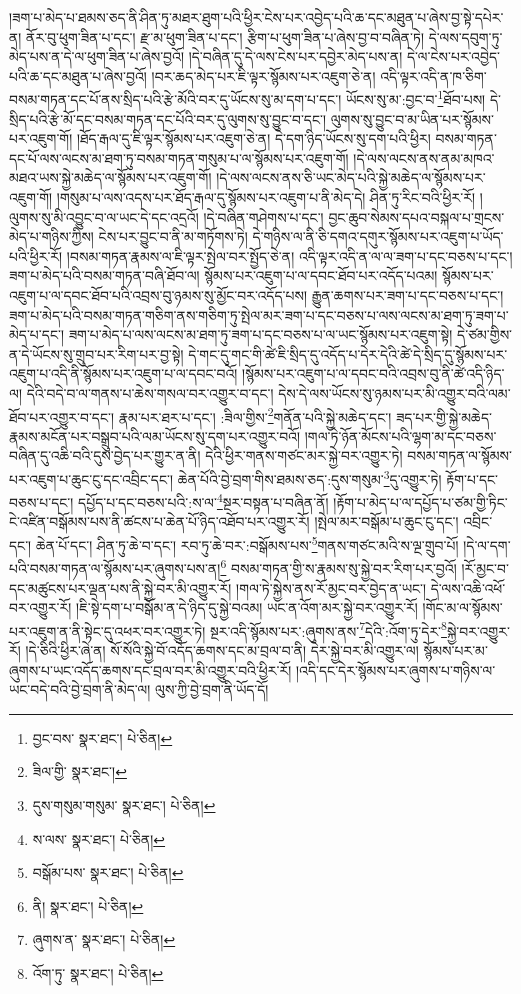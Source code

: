 །ཟག་པ་མེད་པ་ཐམས་ཅད་ནི་ཤིན་ཏུ་མཐར་ཐུག་པའི་ཕྱིར་ངེས་པར་འབྱེད་པའི་ཆ་དང་མཐུན་པ་ཞེས་བྱ་སྟེ་དཔེར་ན། ནོར་བུ་ཕུག་ཟིན་པ་དང་། རྫ་མ་ཕུག་ཟིན་པ་དང་། རྩིག་པ་ཕུག་ཟིན་པ་ཞེས་བྱ་བ་བཞིན་ཏེ། དེ་ལས་དབུག་ཏུ་མེད་པས་ན་དེ་ལ་ཕུག་ཟིན་པ་ཞེས་བྱའོ། །དེ་བཞིན་དུ་དེ་ལས་ངེས་པར་དབྱེར་མེད་པས་ན། དེ་ལ་ངེས་པར་འབྱེད་པའི་ཆ་དང་མཐུན་པ་ཞེས་བྱའོ། །བར་ཆད་མེད་པར་ཇི་ལྟར་སྙོམས་པར་འཇུག་ཅེ་ན། འདི་ལྟར་འདི་ན་ཁ་ཅིག་བསམ་གཏན་དང་པོ་ནས་སྲིད་པའི་རྩེ་མོའི་བར་དུ་ཡོངས་སུ་མ་དག་པ་དང་། ཡོངས་སུ་མ་:བྱང་བ་\footnote{བྱང་བས་  སྣར་ཐང་།  པེ་ཅིན། }ཐོབ་པས། དེ་སྲིད་པའི་རྩེ་མོ་དང་བསམ་གཏན་དང་པོའི་བར་དུ་ལུགས་སུ་བྱུང་བ་དང་། ལུགས་སུ་བྱུང་བ་མ་ཡིན་པར་སྙོམས་པར་འཇུག་གོ། །ཐོད་རྒལ་དུ་ཇི་ལྟར་སྙོམས་པར་འཇུག་ཅེ་ན། དེ་དག་ཉིད་ཡོངས་སུ་དག་པའི་ཕྱིར། བསམ་གཏན་དང་པོ་ལས་ལངས་མ་ཐག་ཏུ་བསམ་གཏན་གསུམ་པ་ལ་སྙོམས་པར་འཇུག་གོ། །དེ་ལས་ལངས་ནས་ནམ་མཁའ་མཐའ་ཡས་སྐྱེ་མཆེད་ལ་སྙོམས་པར་འཇུག་གོ། །དེ་ལས་ལངས་ནས་ཅི་ཡང་མེད་པའི་སྐྱེ་མཆེད་ལ་སྙོམས་པར་འཇུག་གོ། །གསུམ་པ་ལས་འདས་པར་ཐོད་རྒལ་དུ་སྙོམས་པར་འཇུག་པ་ནི་མེད་དེ། ཤིན་ཏུ་རིང་བའི་ཕྱིར་རོ། །ལུགས་སུ་མི་འབྱུང་བ་ལ་ཡང་དེ་དང་འདྲའོ། །དེ་བཞིན་གཤེགས་པ་དང་། བྱང་ཆུབ་སེམས་དཔའ་བསྐལ་པ་གྲངས་མེད་པ་གཉིས་ཀྱིས། ངེས་པར་བྱུང་བ་ནི་མ་གཏོགས་ཏེ། དེ་གཉིས་ལ་ནི་ཅི་དགའ་དགུར་སྙོམས་པར་འཇུག་པ་ཡོད་པའི་ཕྱིར་རོ། །བསམ་གཏན་རྣམས་ལ་ཇི་ལྟར་སྤེལ་བར་སྤྱོད་ཅེ་ན། འདི་ལྟར་འདི་ན་ལ་ལ་ཟག་པ་དང་བཅས་པ་དང་། ཟག་པ་མེད་པའི་བསམ་གཏན་བཞི་ཐོབ་ལ། སྙོམས་པར་འཇུག་པ་ལ་དབང་ཐོབ་པར་འདོད་པའམ། སྙོམས་པར་འཇུག་པ་ལ་དབང་ཐོབ་པའི་འབྲས་བུ་ཉམས་སུ་མྱོང་བར་འདོད་པས། རྒྱུན་ཆགས་པར་ཟག་པ་དང་བཅས་པ་དང་། ཟག་པ་མེད་པའི་བསམ་གཏན་གཅིག་ནས་གཅིག་ཏུ་སྤེལ་མར་ཟག་པ་དང་བཅས་པ་ལས་ལངས་མ་ཐག་ཏུ་ཟག་པ་མེད་པ་དང་། ཟག་པ་མེད་པ་ལས་ལངས་མ་ཐག་ཏུ་ཟག་པ་དང་བཅས་པ་ལ་ཡང་སྙོམས་པར་འཇུག་སྟེ། དེ་ཙམ་གྱིས་ན་དེ་ཡོངས་སུ་གྲུབ་པར་རིག་པར་བྱ་སྟེ། དེ་གང་དུ་གང་གི་ཚེ་ཇི་སྲིད་དུ་འདོད་པ་དེར་དེའི་ཚེ་དེ་སྲིད་དུ་སྙོམས་པར་འཇུག་པ་འདི་ནི་སྙོམས་པར་འཇུག་པ་ལ་དབང་བའོ། །སྙོམས་པར་འཇུག་པ་ལ་དབང་བའི་འབྲས་བུ་ནི་ཚེ་འདི་ཉིད་ལ། དེའི་བདེ་བ་ལ་གནས་པ་ཆེས་གསལ་བར་འགྱུར་བ་དང་། དེས་དེ་ལས་ཡོངས་སུ་ཉམས་པར་མི་འགྱུར་བའི་ལམ་ཐོབ་པར་འགྱུར་བ་དང་། རྣམ་པར་ཐར་པ་དང་། :ཟིལ་གྱིས་\footnote{ཟིལ་གྱི་  སྣར་ཐང་། }གནོན་པའི་སྐྱེ་མཆེད་དང་། ཟད་པར་གྱི་སྐྱེ་མཆེད་རྣམས་མངོན་པར་བསྒྲུབ་པའི་ལམ་ཡོངས་སུ་དག་པར་འགྱུར་བའོ། །གལ་ཏེ་ཉོན་མོངས་པའི་ལྷག་མ་དང་བཅས་བཞིན་དུ་འཆི་བའི་དུས་བྱེད་པར་གྱུར་ན་ནི། དེའི་ཕྱིར་གནས་གཙང་མར་སྐྱེ་བར་འགྱུར་ཏེ། བསམ་གཏན་ལ་སྙོམས་པར་འཇུག་པ་ཆུང་ངུ་དང་འབྲིང་དང་། ཆེན་པོའི་བྱེ་བྲག་གིས་ཐམས་ཅད་:དུས་གསུམ་\footnote{དུས་གསུམ་གསུམ་  སྣར་ཐང་།  པེ་ཅིན། }དུ་འགྱུར་ཏེ། རྟོག་པ་དང་བཅས་པ་དང་། དཔྱོད་པ་དང་བཅས་པའི་:ས་ལ་\footnote{ས་ལས་  སྣར་ཐང་།  པེ་ཅིན། }སྔར་བསྟན་པ་བཞིན་ནོ། །རྟོག་པ་མེད་པ་ལ་དཔྱོད་པ་ཙམ་གྱི་ཏིང་ངེ་འཛིན་བསྒོམས་པས་ནི་ཚངས་པ་ཆེན་པོ་ཉིད་འཐོབ་པར་འགྱུར་རོ། །སྤེལ་མར་བསྒོམ་པ་ཆུང་ངུ་དང་། འབྲིང་དང་། ཆེན་པོ་དང་། ཤིན་ཏུ་ཆེ་བ་དང་། རབ་ཏུ་ཆེ་བར་:བསྒོམས་པས་\footnote{བསྒོམ་པས་  སྣར་ཐང་།  པེ་ཅིན། }གནས་གཙང་མའི་ས་ལྔ་གྲུབ་པོ། །དེ་ལ་དག་པའི་བསམ་གཏན་ལ་སྙོམས་པར་ཞུགས་པས་ན།\footnote{ནི།  སྣར་ཐང་།  པེ་ཅིན། } བསམ་གཏན་གྱི་ས་རྣམས་སུ་སྐྱེ་བར་རིག་པར་བྱའོ། །རོ་མྱང་བ་དང་མཚུངས་པར་ལྡན་པས་ནི་སྐྱེ་བར་མི་འགྱུར་རོ། །གལ་ཏེ་སྐྱེས་ནས་རོ་མྱང་བར་བྱེད་ན་ཡང་། དེ་ལས་འཆི་འཕོ་བར་འགྱུར་རོ། །ཇི་སྟེ་དག་པ་བསྒོམ་ན་དེ་ཉིད་དུ་སྐྱེ་བའམ། ཡང་ན་འོག་མར་སྐྱེ་བར་འགྱུར་རོ། །གོང་མ་ལ་སྙོམས་པར་འཇུག་ན་ནི་སྟེང་དུ་འཕར་བར་འགྱུར་ཏེ། སྔར་འདི་སྙོམས་པར་:ཞུགས་ནས་\footnote{ཞུགས་ན་  སྣར་ཐང་།  པེ་ཅིན། }དེའི་:འོག་ཏུ་དེར་\footnote{འོག་ཏུ་  སྣར་ཐང་།  པེ་ཅིན། }སྐྱེ་བར་འགྱུར་རོ། །དེ་ཅིའི་ཕྱིར་ཞེ་ན། སོ་སོའི་སྐྱེ་བོ་འདོད་ཆགས་དང་མ་བྲལ་བ་ནི། དེར་སྐྱེ་བར་མི་འགྱུར་ལ། སྙོམས་པར་མ་ཞུགས་པ་ཡང་འདོད་ཆགས་དང་བྲལ་བར་མི་འགྱུར་བའི་ཕྱིར་རོ། །འདི་དང་དེར་སྙོམས་པར་ཞུགས་པ་གཉིས་ལ་ཡང་བདེ་བའི་བྱེ་བྲག་ནི་མེད་ལ། ལུས་ཀྱི་བྱེ་བྲག་ནི་ཡོད་དོ། 